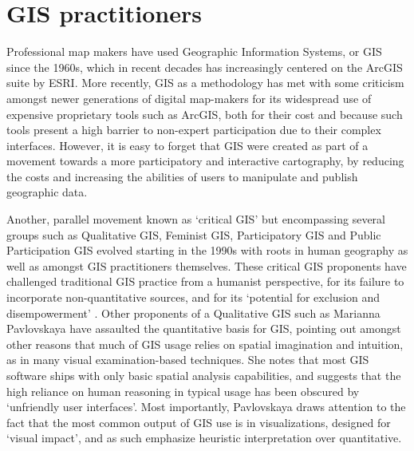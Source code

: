 \documentclass[11pt,oneside,notitlepage]{report}
\begin{document}
\section{GIS practitioners}
\label{sec:gis}

Professional map makers have used Geographic Information Systems, or GIS since the 1960s, which in recent decades has increasingly centered on the ArcGIS suite by ESRI. More recently, GIS as a methodology has met with some criticism amongst newer generations of digital map-makers for its widespread use of expensive proprietary tools such as ArcGIS, both for their cost and because such tools present a high barrier to non-expert participation due to their complex interfaces. However, it is easy to forget that GIS were created as part of a movement towards a more participatory and interactive cartography, by reducing the costs and increasing the abilities of users to manipulate and publish geographic data.

Another, parallel movement known as `critical GIS' but encompassing several groups such as Qualitative GIS, Feminist GIS, Participatory GIS and Public Participation GIS evolved starting in the 1990s with roots in human geography as well as amongst GIS practitioners themselves. These critical GIS proponents have challenged traditional GIS practice from a humanist perspective, for its failure to incorporate non-quantitative sources, and for its `potential for exclusion and disempowerment' \cite{elwood2009qualitative}. Other proponents of a Qualitative GIS such as Marianna Pavlovskaya have assaulted the quantitative basis for GIS, pointing out amongst other reasons that much of GIS usage relies on spatial imagination and intuition, as in many visual examination-based techniques. She notes that most GIS software ships with only basic spatial analysis capabilities, and suggests that the high reliance on human reasoning in typical usage has been obscured by `unfriendly user interfaces'. Most importantly, Pavlovskaya draws attention to the fact that the most common output of GIS use is in visualizations, designed for `visual impact', and as such emphasize heuristic interpretation over quantitative. \cite{pavlovskaya2009nonquantitative} 
\end{document}
